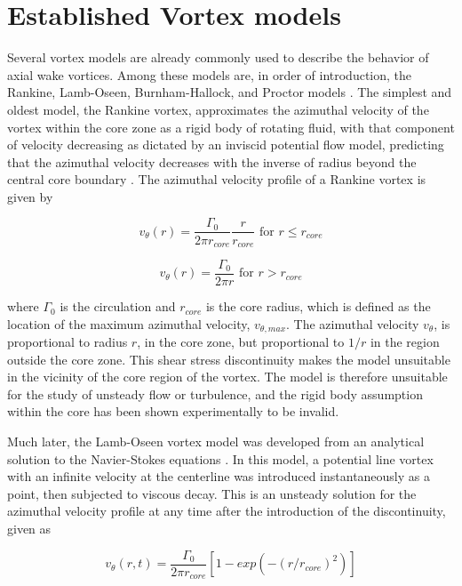 \section{Established Vortex models}
Several vortex models are already commonly used to describe the behavior of 
axial wake vortices. Among these models are, in order of introduction, the 
Rankine, Lamb-Oseen, Burnham-Hallock, and Proctor models \cite{ahmad2014}. The 
simplest and oldest model, the Rankine vortex, approximates the azimuthal 
velocity of the vortex within the core zone as a rigid body of rotating fluid, 
with that component of velocity decreasing as dictated by an inviscid potential 
flow model, predicting that the azimuthal velocity decreases with the inverse 
of radius beyond the central core boundary \cite{rankine1869}. The azimuthal 
velocity profile of a Rankine vortex is given by

\begin{equation}
v_{\theta}(r) = \frac{\Gamma_0}{2 \pi r_{core}} \frac{r}{r_{core}} 
	\text{ for } r \leq r_{core}
	\label{eq:rankine1}
\end{equation}

\begin{equation}
v_{\theta}(r) = \frac{\Gamma_0}{2 \pi r}
	\text{ for } r > r_{core}
	\label{eq:rankine2}
\end{equation}

\noindent
where $\Gamma_0$ is the circulation and $r_{core}$ is the core radius,
which is defined as the location of the maximum azimuthal velocity, 
$v_{\theta, max}$. The azimuthal velocity $v_{\theta}$, is proportional to 
radius $r$, in the core zone, but proportional to $1/r$ in the region outside 
the core zone. This shear stress discontinuity makes the model unsuitable in 
the vicinity of the core region of the vortex. The model is therefore 
unsuitable for the study of unsteady flow or turbulence, and the rigid body 
assumption within the core has been shown experimentally to be invalid.

Much later, the Lamb-Oseen vortex model was developed from an 
analytical solution to the Navier-Stokes equations \cite{lamb1932}. In this 
model, a potential 
line vortex with an infinite velocity at the centerline was introduced 
instantaneously as a point, then subjected to viscous decay. This is an 
unsteady solution for the azimuthal 
velocity profile at any time after the introduction of the discontinuity, given 
as

\begin{equation}
v_{\theta}(r,t) = \frac{\Gamma_0}{2 \pi r_{core}}[1 - 
							exp(-(r / r_{core})^2)]
	\label{eq:lamb1}
\end{equation}

